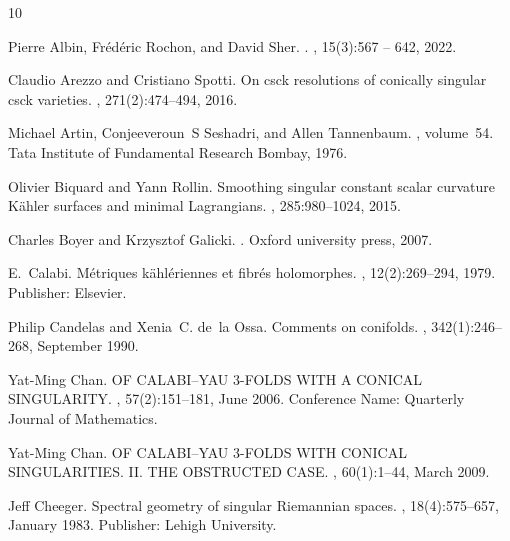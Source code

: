 \documentclass[a4paper,11pt]{article}
\begin{document}
\begin{thebibliography}{10}

Pierre Albin, Fr{\'e}d{\'e}ric Rochon, and David Sher.
.
, 15(3):567 -- 642, 2022.

Claudio Arezzo and Cristiano Spotti.
\newblock On csck resolutions of conically singular csck varieties.
, 271(2):474--494, 2016.

Michael Artin, Conjeeveroun~S Seshadri, and Allen Tannenbaum.
, volume~54.
\newblock Tata Institute of Fundamental Research Bombay, 1976.

Olivier Biquard and Yann Rollin.
\newblock Smoothing singular constant scalar curvature {K}\"ahler surfaces and minimal {L}agrangians.
, 285:980--1024, 2015.

Charles Boyer and Krzysztof Galicki.
.
\newblock Oxford university press, 2007.

E.~Calabi.
\newblock Métriques kählériennes et fibrés holomorphes.
, 12(2):269--294, 1979.
\newblock Publisher: Elsevier.

Philip Candelas and Xenia~C. de~la Ossa.
\newblock Comments on conifolds.
, 342(1):246--268, September 1990.

Yat-Ming Chan.
 {OF} {CALABI}–{YAU} 3-{FOLDS} {WITH} {A} {CONICAL} {SINGULARITY}.
, 57(2):151--181, June 2006.
\newblock Conference Name: Quarterly Journal of Mathematics.

Yat-Ming Chan.
 {OF} {CALABI}–{YAU} 3-{FOLDS} {WITH} {CONICAL} {SINGULARITIES}. {II}. {THE} {OBSTRUCTED} {CASE}.
, 60(1):1--44, March 2009.

Jeff Cheeger.
\newblock Spectral geometry of singular {Riemannian} spaces.
, 18(4):575--657, January 1983.
\newblock Publisher: Lehigh University.


\end{thebibliography}
\end{document}
